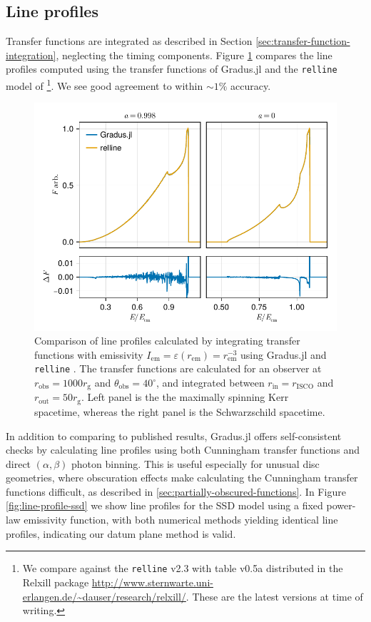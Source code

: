 \documentclass[fleqn,usenatbib]{mnras}
\newcommand{\Gradus}{Gradus.jl }
\newcommand{\relline}{\texttt{relline} }
\newcommand{\rg}{r_\text{g}}
\newcommand{\risco}{r_\text{ISCO}}
\begin{document}
\subsection{Line profiles}

Transfer functions are integrated as described in Section
\ref{sec:transfer-function-integration}, neglecting the timing components.
Figure \ref{fig:relline-comparison} compares the line profiles computed using
the transfer functions of \Gradus and the \relline model of
\cite{dauser_broad_2010}\footnote{We compare against the \relline v2.3 with
table v0.5a distributed in the Relxill package
\url{http://www.sternwarte.uni-erlangen.de/~dauser/research/relxill/}. These are
the latest versions at time of writing.}. We see good agreement to within $\sim
1\%$ accuracy.

\begin{figure}
	\centering
	\includegraphics[width=0.99\linewidth]{figures/lineprofiles.comparison.pdf}
	\caption{Comparison of line profiles calculated by integrating transfer functions with emissivity $I_\text{em} = \varepsilon(r_\text{em}) = r_\text{em}^{-3}$ using \Gradus and \relline. The transfer functions are calculated for an observer at $r_\text{obs} = 1000\rg$ and $\theta_\text{obs} = 40^\circ$, and integrated between $r_\text{in} = \risco$ and $r_\text{out} = 50 \rg$. Left panel is the the maximally spinning Kerr spacetime, whereas the right panel is the Schwarzschild spacetime.}
	\label{fig:relline-comparison}
\end{figure}

In addition to comparing to published results, \Gradus offers self-consistent
checks by calculating line profiles using both Cunningham transfer functions and
direct $(\alpha, \beta)$ photon binning. This is useful especially for unusual
disc geometries, where obscuration effects make calculating the Cunningham
transfer functions difficult, as described in
\ref{sec:partially-obscured-functions}. In Figure \ref{fig:line-profile-ssd} we
show line profiles for the SSD model using a fixed power-law emissivity
function, with both numerical methods yielding identical line profiles,
indicating our datum plane method is valid.
\end{document}
